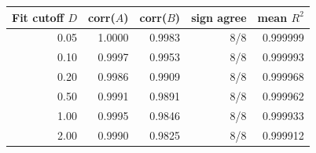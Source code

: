 \begin{tabular}{rrrrr}
\toprule
Fit cutoff $D$ & corr($A$) & corr($B$) & sign agree & mean $R^2$ \\
\midrule
0.05 & 1.0000 & 0.9983 & 8/8 & 0.999999 \\
0.10 & 0.9997 & 0.9953 & 8/8 & 0.999993 \\
0.20 & 0.9986 & 0.9909 & 8/8 & 0.999968 \\
0.50 & 0.9991 & 0.9891 & 8/8 & 0.999962 \\
1.00 & 0.9995 & 0.9846 & 8/8 & 0.999933 \\
2.00 & 0.9990 & 0.9825 & 8/8 & 0.999912 \\
\bottomrule
\end{tabular}
